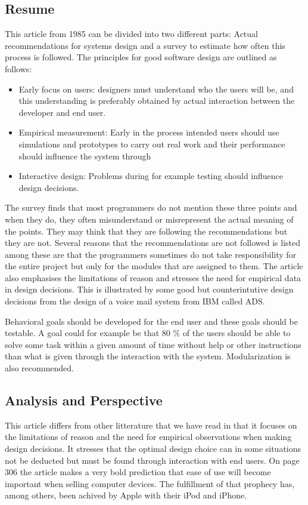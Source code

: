\documentclass[11pt,a4paper]{report}
\begin{document}
\subsection{Resume}
This article from 1985 can be divided into two different parts: Actual recommendations for systems design and a survey to estimate how often this process is followed. The principles for good software design are outlined as follows:
\begin{itemize}
\item Early focus on users: designers must understand who the users will be, and this understanding is preferably obtained by actual interaction between the developer and end user.
\item Empirical measurement: Early in the process intended users should use simulations and prototypes to carry out real work and their performance should influence the system through
\item Interactive design: Problems during for example testing should influence design decisions. 
\end{itemize}
The survey finds that most programmers do not mention these three points and when they do, they often misunderstand or misrepresent the actual meaning of the points. They may think that they are following the recommendations but they are not. Several reasons that the recommendations are not followed is listed among these are that the programmers sometimes do not take responsibility for the entire project but only for the modules that are assigned to them. The article also emphasises the limitations of reason and stresses the need for empirical data in design decisions. This is illustrated by some good but counterintutive design decisions from the design of a voice mail system from IBM called ADS.

Behavioral goals should be developed for the end user and these goals should be testable. A goal could for example be that 80 \% of the users should be able to solve some task within a given amount of time without help or other instructions than what is given through the interaction with the system. Modularization is also recommended.
\subsection{Analysis and Perspective}
This article differs from other litterature that we have read in that it focuses on the limitations of reason and the need for empirical observations when making design decisions. It stresses that the optimal design choice can in some situations not be deducted but must be found through interaction with end users. On page 306 the article makes a very bold prediction that ease of use will become important when selling computer devices. The fulfillment of that prophecy has, among others, been achived by Apple with their iPod and iPhone.
\end{document}
